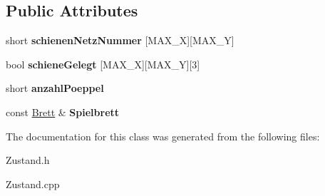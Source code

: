 \subsection*{Public Attributes}
\begin{DoxyCompactItemize}
\item 
\hypertarget{class_zustand_ab3a05b260a1c02bad4d110d6026f2800}{short {\bfseries schienen\-Netz\-Nummer} \mbox{[}M\-A\-X\-\_\-\-X\mbox{]}\mbox{[}M\-A\-X\-\_\-\-Y\mbox{]}}\label{class_zustand_ab3a05b260a1c02bad4d110d6026f2800}

\item 
\hypertarget{class_zustand_a425b7daee28c7df0c7a8a778226ee5a7}{bool {\bfseries schiene\-Gelegt} \mbox{[}M\-A\-X\-\_\-\-X\mbox{]}\mbox{[}M\-A\-X\-\_\-\-Y\mbox{]}\mbox{[}3\mbox{]}}\label{class_zustand_a425b7daee28c7df0c7a8a778226ee5a7}

\item 
\hypertarget{class_zustand_a3462aff3d3b1808a8faa52f1c763c748}{short {\bfseries anzahl\-Poeppel}}\label{class_zustand_a3462aff3d3b1808a8faa52f1c763c748}

\item 
\hypertarget{class_zustand_a27bb32e80609531b180ee8ed8aad6769}{const \hyperlink{class_brett}{Brett} \& {\bfseries Spielbrett}}\label{class_zustand_a27bb32e80609531b180ee8ed8aad6769}

\end{DoxyCompactItemize}


The documentation for this class was generated from the following files\-:\begin{DoxyCompactItemize}
\item 
Zustand.\-h\item 
Zustand.\-cpp\end{DoxyCompactItemize}
